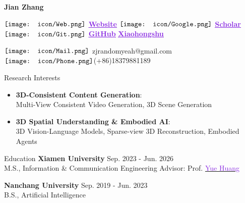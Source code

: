 \documentclass{resume} %
\newcommand*\git{\vcenter{\hbox{\texttt{[image: icon/Git.png]}}}}
\newcommand*\Google{\vcenter{\hbox{\texttt{[image: icon/Google.png]}}}}
\newcommand*\web{\vcenter{\hbox{\texttt{[image: icon/Web.png]}}}}
\newcommand*\email{\vcenter{\hbox{\texttt{[image: icon/Mail.png]}}}}
\newcommand*\phone{\vcenter{\hbox{\texttt{[image: icon/Phone.png]}}}}
\begin{document}
\begin{vwcol}[widths={0.4,0.6}, sep=.8cm, justify=flush,rule=0pt,indent=1em] 
\huge{\textbf{Jian Zhang}}

\small $\web$ \href{https://jian-zhang-3dv.github.io/Jian-Zhang-3DV/}{\textcolor{BlueViolet}{\underline{\textbf{Website}}}} 
\hspace{0mm} $\Google$ \href{https://scholar.google.com/citations?user=qBNtBsAAAAAJ&hl=en&oi=sra}{\textcolor{BlueViolet}{\bf \underline{Scholar}}} \hspace{0mm} $\git$ \href{https://github.com/Jian-Zhang-3DV}{\textcolor{BlueViolet}{\bf \underline{GitHub}}} \hspace{0mm} \href{https://www.xiaohongshu.com/user/profile/599e002e82ec39105af73220}{\textcolor{BlueViolet}{\bf \underline{Xiaohongshu}}}

$\email$ zjrandomyeah@gmail.com \hspace{0mm} $\phone$(+86)18379881189
\end{vwcol} 

\vspace{-0.7mm}
\begin{rSection}{Research Interests}
\vspace{-1mm}
\begin{itemize}[leftmargin=1.5em, itemsep=-0.5mm]
    \item \textbf{3D-Consistent Content Generation}: 
    \\ \small Multi-View Consistent Video Generation, 3D Scene Generation
    \item \textbf{3D Spatial Understanding \& Embodied AI}: 
    \\ \small 3D Vision-Language Models, Sparse-view 3D Reconstruction, Embodied Agents
\end{itemize}
\end{rSection}

\vspace{-1.5mm}

\begin{rSection}{Education}
\vspace{-0mm}
\vspace{-1mm}
{\bf Xiamen University} \hfill Sep. 2023 - Jun. 2026
\\ M.S., Information \& Communication Engineering 
\hfill Advisor: Prof. \href{https://huangyue05.github.io/}{\textcolor{BlueViolet}{Yue Huang}}

\vspace{-1mm}
{\bf Nanchang University} \hfill Sep. 2019 - Jun. 2023
\\ B.S., Artificial Intelligence

\end{rSection}
\end{document}

